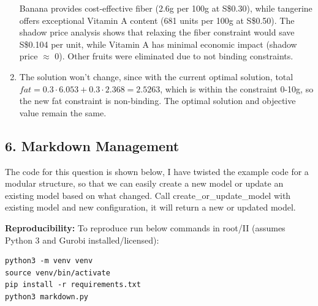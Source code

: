 \documentclass[12pt]{article}
\begin{document}
\begin{enumerate}[label= (\alph*), leftmargin=2em]
Banana provides cost-effective fiber (2.6g per 100g at S\$0.30), while tangerine offers exceptional Vitamin A content (681 units per 100g at S\$0.50). The shadow price analysis shows that relaxing the fiber constraint would save S\$0.104 per unit, while Vitamin A has minimal economic impact (shadow price $\approx$ 0). Other fruits were eliminated due to not binding constraints.

\item The solution won't change, since with the current optimal solution, total $fat = 0.3\cdot6.053 + 0.3\cdot2.368 = 2.5263$, which is within the constraint 0-10g, so the new fat constraint is non-binding. The optimal solution and objective value remain the same.
\end{enumerate}

\subsection*{6. Markdown Management}
The code for this question is shown below, I have twisted the example code for a modular structure, so that we can easily create a new model or update an existing model based on what changed. Call create\_or\_update\_model with existing model and new configuration, it will return a new or updated model.

\textbf{Reproducibility:} To reproduce run below commands in root/II (assumes Python 3 and Gurobi installed/licensed):
\begin{verbatim}
python3 -m venv venv
source venv/bin/activate
pip install -r requirements.txt
python3 markdown.py
\end{verbatim}
\end{document}
